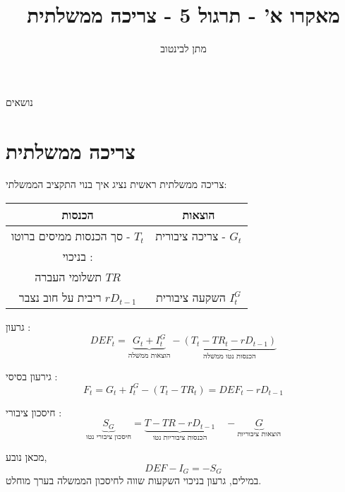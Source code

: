 \documentclass[usenames,dvipsnames,10pt]{beamer}
\title[צריכה ממשלתית]{{מאקרו א' - תרגול 5 - צריכה ממשלתית}}
\author{\texthebrew{מתן לבינטוב}}
\institute[{{ אב"ג}}]{{ אוניברסיטת בן גוריון בנגב}}
\date{}
\begin{document}
\begin{RTL}
\begin{frame}
\titlepage
\end{frame}
\begin{frame}{נושאים}
    \tableofcontents
\end{frame}
\section{צריכה ממשלתית}
\begin{frame}[allowframebreaks]{צריכה ממשלתית}
    ראשית נציג איך בנוי התקציב הממשלתי:
    \begin{table}
    \centering
    \begin{tabular}{ |c|c| } \hline 
         הכנסות& הוצאות\\ \hline 
         סך הכנסות ממיסים ברוטו  - $T_t$& צריכה ציבורית  - $G_t$\\ \hline 
         בניכוי : \\ תשלומי העברה $TR$ \\ ריבית על חוב נצבר $rD_{t-1}$ &השקעה ציבורית $I_t^G$ \\ \hline
    \end{tabular}
    \end{table}
גרעון :
\begin{equation*}
    DEF_t = \underbrace{ G_t + I_t^G}_{\text{הוצאות ממשלה}} - \underbrace{(T_t -TR_t - rD_{t-1})}_{\text{הכנסות נטו ממשלה}}
\end{equation*}

גירעון בסיסי :
\begin{equation*}
    F_t = G_t + I_t^G - (T_t -TR_t) = DEF_t - rD_{t-1}
\end{equation*}
\begin{block}{חיסכון ציבורי :
    }
    \begin{equation*}
        \underbrace{ S_G}_{\text{חיסכון ציבורי נטו}} = \underbrace{T - TR -rD_{t-1}}_{\text{הכנסות ציבוריות נטו}}\quad  -\underbrace{G}_{\text{הוצאות ציבוריות}}
     \end{equation*}    
\end{block}

מכאן נובע, 
\begin{equation*}
    DEF - I_G = -S_G
\end{equation*}
במילים, גרעון בניכוי השקעות שווה לחיסכון הממשלה בערך מוחלט.

\end{frame}

\end{RTL}
\end{document}
